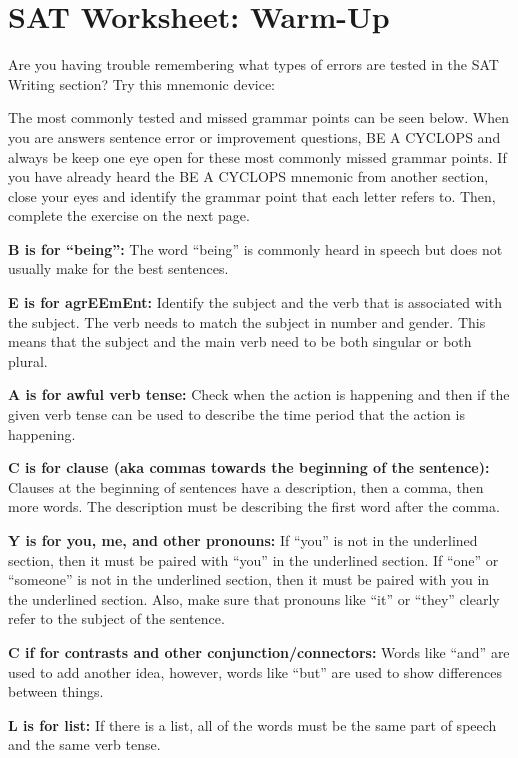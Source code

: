 \section{SAT Worksheet: Warm-Up}

Are you having trouble remembering what types of errors are tested in the SAT Writing section?
Try this mnemonic device:

The most commonly tested and missed grammar points can be seen below. When you are answers sentence error or improvement questions, BE A CYCLOPS and always be keep one eye open for these most commonly missed grammar points. If you have already heard the BE A CYCLOPS mnemonic from another section, close your eyes and identify the grammar point that each letter refers to. Then, complete the exercise on the next page. 

\bigskip
\textbf{B is for “being”:} The word “being” is commonly heard in speech but does not usually make for the best sentences.

\bigskip
\textbf{E is for agrEEmEnt:} Identify the subject and the verb that is associated with the subject. The verb needs to match the subject in number and gender. This means that the subject and the main verb need to be both singular or both plural. 

\bigskip

\bigskip
\textbf{A is for awful verb tense:} Check when the action is happening and then if the given verb tense can be used to describe the time period that the action is happening. 

\bigskip

\bigskip
\textbf{C is for clause (aka commas towards the beginning of the sentence):} Clauses at the beginning of sentences have a description, then a comma, then more words. The description must be describing the first word after the comma. 

\bigskip
\textbf{Y is for you, me, and other pronouns:} If “you” is not in the underlined section, then it must be paired with “you” in the underlined section. If “one” or “someone” is not in the underlined section, then it must be paired with you in the underlined section. Also, make sure that pronouns like “it” or “they” clearly refer to the subject of the sentence. 

\bigskip
\textbf{C if for contrasts and other conjunction/connectors:} Words like “and” are used to add another idea, however, words like “but” are used to show differences between things. 

\bigskip
\textbf{L is for list:} If there is a list, all of the words must be the same part of speech and the same verb tense. 

